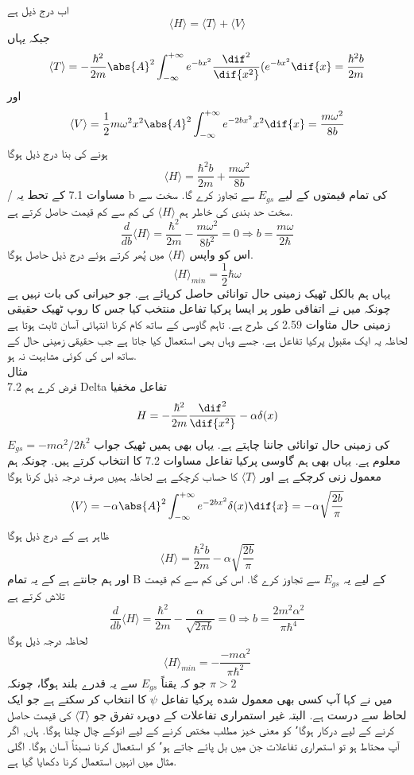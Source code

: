 اب درج ذیل ہے
 \[ \langle H \rangle=\langle T \rangle + \langle V \rangle\]
جبکہ یہاں
\[\langle T \rangle=-\frac{\hbar^{2}}{2m}\abs{A}^{2}\int_{-\infty}^{+\infty}e^{-bx^{2}}\frac{\dif^{2}}{\dif{x^{2}}}(e^{-bx^{2}}\dif{x}=\frac{\hbar^{2}b}{2m}\]
اور
\[\langle V\rangle=\frac{1}{2}m\omega^{2}x^{2}\abs{A}^{2}\int_{-\infty}^{+\infty}e^{-2bx^{2}}x^{2}\dif{x}=\frac{m\omega^{2}}{8b}\]
ہونے کی بنا درج ذیل ہوگا
\[ \langle H \rangle=\frac{\hbar^{2}b}{2m}+\frac{m\omega^{2}}{8b}\]
/
مساوات 7.1 کے تحط یہ b کی تمام قیمتوں کے لیے
\(E_{gs}\)
 سے تجاوز کرے گا. سخت سے سخت حد بندی کی خاطر ہم
 \( \langle H\rangle\)
 کی کم سے کم قیمت حاصل کرتے ہے.
\[\frac{d}{db}\langle H\rangle=\frac{\hbar^{2}}{2m}-\frac{m\omega^{2}}{8b^{2}}=0\Rightarrow b=\frac{m\omega}{2\hbar}\]
اس کو واپس
 \( \langle H\rangle \)
میں پُھر کرتے ہوئے درج ذیل حاصل ہوگا.
 \[\langle H\rangle _{min} =\frac{1}{2}\hbar\omega\]
یہاں ہم بالکل ٹھیک زمینی حال توانائی حاصل کرپائے ہے. جو حیرانی کی بات نہیں ہے چونکہ میں نے اتفاقی طور پر ایسا پرکیا تفاعل منتخب کیا جس کا روپ ٹھیک حقیقی  زمینی حال مثاوات 2.59 کی طرح ہے.   تاہم گاوسی کے ساتھ کام کرنا انتہائی آسان ثابت ہوتا ہے لحاظہ یہ ایک مقبول پرکیا تفاعل ہے. جسے وہاں بھی استعمال کیا جاتا ہے جب حقیقی زمینی حال کے ساتھ اس کی کوئی مشابہت نہ ہو.\\
مثال \\7.2
فرض کرے ہم Delta تفاعل مخفیا
\[H=-\frac{\hbar^{2}}{2m}\frac{\dif^{2}}{\dif{x^{2}}}-\alpha\delta(x)\]
کی زمینی حال توانائی جاننا چاہتے ہے. یہاں بھی ہمیں ٹھیک جواب
\(E_{gs}=-m\alpha^{2}/2\hbar^{2}\)
معلوم ہے. یہاں بھی ہم گاوسی پرکیا تفاعل مساوات 7.2 کا انتخاب کرتے ہیں. چونکہ ہم معمول زنی کرچکے ہے اور  
\(\langle T\rangle\)
 کا حساب کرچکے ہے لحاظہ ہمیں صرف درجہ ذیل کرنا ہوگا
\[\langle V\rangle=-\alpha\abs{A}^{2}\int_{-\infty}^{+\infty}e^{-2bx^{2}}\delta(x)\dif{x}=-\alpha\sqrt{\frac{2b}{\pi}}\]
ظاہر ہے کے درج ذيل ہوگا
 \[\langle H\rangle=\frac{\hbar^{2}b}{2m}-\alpha\sqrt{\frac{2b}{\pi}}\]
اور ہم جانتے ہے کے یہ تمام B  کے لیے یہ
\( E_{gs}\)
 سے تجاوز کرے گا. اس کی کم سے كم قیمت تلاش کرتے ہے\\
\[\frac{d}{db}\langle H\rangle=\frac{\hbar^{2}}{2m}-\frac{\alpha}{\sqrt{2\pi b}}=0\Rightarrow b=\frac{2m^{2}\alpha^{2}}{\pi\hbar^{4}}\]
لحاظہ درجہ ذیل ہوگا 
 \[\langle H\rangle _{min} =-\frac{-m\alpha^{2}}{\pi\hbar^{2}}\]
جو کہ یقناً
\( E_{gs}\)
 سے یہ قدرے بلند ہوگا، چونکہ
\(\pi>2\) \\
میں نے کہا آپ کسی بھی معمول شده پرکیا تفاعل 
\(\psi\) 
کا انتخاب کر سکتے ہے جو ایک لحاظ سے درست ہے. البتہ غیر استمراری تفاعلات کے دوہرہ تفرق جو
\( \langle T \rangle\)
کی قیمت حاصل کرنے کے لیے درکار ہوگا٬ کو معنی خیز مطلب مختص کرنے کے لیے انوکے چال چلنا ہوگا. ہاں, اگر آپ محتاط ہو تو استمراری تفاعلات جن میں بل پائے جاتے ہو٬ کو استعمال کرنا نسبتاً آسان ہوگا. اگلی مثال میں انہیں استعمال کرنا دکھایا گیا ہے.\\
